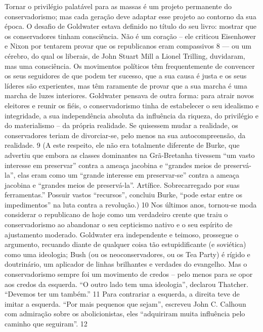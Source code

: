 Tornar o privilégio palatável para as massas é um projeto permanente do conservadorismo; mas cada geração deve adaptar esse projeto ao contorno da sua época. O desafio de Goldwater estava definido no título do seu livro: mostrar que os conservadores tinham consciência. Não é um coração – ele criticou Eisenhower e Nixon por tentarem provar que os republicanos eram compassivos
 {\color{blue} 8}  
— ou um cérebro, do qual os liberais, de John Stuart Mill a Lionel Trilling, duvidaram, mas uma consciência. Os movimentos políticos têm frequentemente de convencer os seus seguidores de que podem ter sucesso, que a sua causa é justa e os seus líderes são experientes, mas têm raramente de provar que a sua marcha é uma marcha de luzes interiores. Goldwater pensava de outra forma: para atrair novos eleitores e reunir os fiéis, o conservadorismo tinha de estabelecer o seu idealismo e integridade, a sua independência absoluta da influência da riqueza, do privilégio e do materialismo – da própria realidade. Se quisessem mudar a realidade, os conservadores teriam de divorciar-se, pelo menos na sua autocompreensão, da realidade.
 {\color{blue} 9}  
(A este respeito, ele não era totalmente diferente de Burke, que advertiu que embora as classes dominantes na Grã-Bretanha tivessem “um vasto interesse em preservar” contra a ameaça jacobina e “grandes meios de preservá-la”, elas eram como um “grande interesse em preservar-se” contra a ameaça jacobina e “grandes meios de preservá-la”. Artífice. Sobrecarregado por suas ferramentas.” Possuir vastos “recursos”, concluiu Burke, “pode estar entre os impedimentos” na luta contra a revolução.)
 {\color{blue} 10}  
Nos últimos anos, tornou-se moda considerar o republicano de hoje como um verdadeiro crente que traiu o conservadorismo ao abandonar o seu cepticismo nativo e o seu espírito de ajustamento moderado. Goldwater era independente e teimoso, prossegue o argumento, recuando diante de qualquer coisa tão estupidificante (e soviética) como uma ideologia; Bush (ou os neoconservadores, ou os Tea Party) é rígido e doutrinário, um aplicador de linhas brilhantes e verdades do evangelho. Mas o conservadorismo sempre foi um movimento de credos – pelo menos para se opor aos credos da esquerda. “O outro lado tem uma ideologia”, declarou Thatcher. “Devemos ter um também.”
 {\color{blue} 11}  
Para contrariar a esquerda, a direita teve de imitar a esquerda. “Por mais pequenos que sejam”, escreveu John C. Calhoun com admiração sobre os abolicionistas, eles “adquiriram muita influência pelo caminho que seguiram”.
 {\color{blue} 12}  

